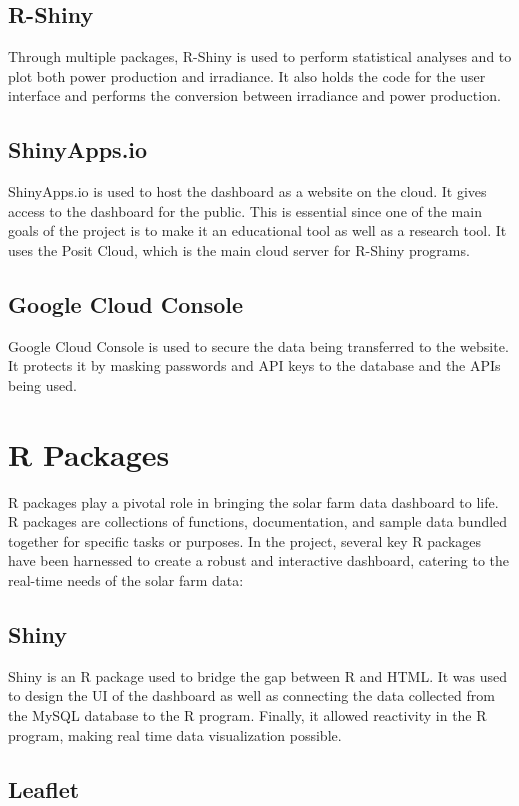 \documentclass{sigchi}
\begin{document}
\subsection{R-Shiny}
Through multiple packages, R-Shiny is used to perform statistical analyses and to plot both power production and irradiance. It also holds the code for the user interface and performs the conversion between irradiance and power production. 

\subsection{ShinyApps.io} 
ShinyApps.io is used to host the dashboard as a website on the cloud. It gives access to the dashboard for the public. This is essential since one of the main goals of the project is to make it an educational tool as well as a research tool. It uses the Posit Cloud, which is the main cloud server for R-Shiny programs.

\subsection{Google Cloud Console}
Google Cloud Console is used to secure the data being transferred to the website. It protects it by masking passwords and API keys to the database and the APIs being used.

\section{R Packages}
R packages play a pivotal role in bringing the solar farm data dashboard to life. R packages are collections of functions, documentation, and sample data bundled together for specific tasks or purposes. In the project, several key R packages have been harnessed to create a robust and interactive dashboard, catering to the real-time needs of the solar farm data:

\subsection{Shiny}

Shiny is an R package used to bridge the gap between R and HTML. It was used to design the UI of the dashboard as well as connecting the data collected from the MySQL database to the R program. Finally, it allowed reactivity in the R program, making real time data visualization possible.\cite{R-Shiny}\cite{Wickham_2021}

\subsection{Leaflet}
\end{document}
